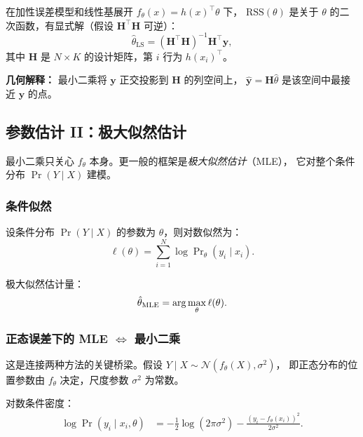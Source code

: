 在加性误差模型和线性基展开 $f_\theta(x) = h(x)^\top \theta$ 下，
$\mathrm{RSS}(\theta)$ 是关于 $\theta$ 的二次函数，有显式解（假设 $\mathbf{H}^\top\mathbf{H}$ 可逆）：
\begin{equation}
    \hat{\theta}_{\mathrm{LS}} = (\mathbf{H}^\top\mathbf{H})^{-1} \mathbf{H}^\top \mathbf{y},
\end{equation}
其中 $\mathbf{H}$ 是 $N \times K$ 的设计矩阵，第 $i$ 行为 $h(x_i)^\top$。

\textbf{几何解释：} 最小二乘将 $\mathbf{y}$ 正交投影到 $\mathbf{H}$ 的列空间上，
$\hat{\mathbf{y}} = \mathbf{H}\hat{\theta}$ 是该空间中最接近 $\mathbf{y}$ 的点。

\subsection{参数估计 II：极大似然估计}

最小二乘只关心 $f_\theta$ 本身。更一般的框架是\emph{极大似然估计}（MLE），
它对整个条件分布 $\Pr(Y \mid X)$ 建模。

\subsubsection{条件似然}

设条件分布 $\Pr(Y \mid X)$ 的参数为 $\theta$，则对数似然为：
\begin{equation}\label{eq:loglik}
    \ell(\theta) = \sum_{i=1}^{N} \log \Pr\nolimits_\theta(y_i \mid x_i).
\end{equation}

极大似然估计量：
\begin{equation}
    \hat{\theta}_{\mathrm{MLE}} = \arg\max_\theta \ell(\theta).
\end{equation}

\subsubsection{正态误差下的 MLE $\Leftrightarrow$ 最小二乘}

这是连接两种方法的关键桥梁。假设 $Y \mid X \sim \mathcal{N}(f_\theta(X), \sigma^2)$，
即正态分布的位置参数由 $f_\theta$ 决定，尺度参数 $\sigma^2$ 为常数。

对数条件密度：
\begin{align}
    \log \Pr(y_i \mid x_i, \theta)
    &= -\frac{1}{2}\log(2\pi\sigma^2) - \frac{(y_i - f_\theta(x_i))^2}{2\sigma^2}.
\end{align}

